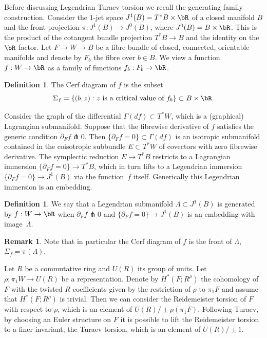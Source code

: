 \documentclass[JEP,XML,SOM,Unicode,NoFloatCountersInSection]{cedram}
\theoremstyle{plain}
\theoremstyle{definition}
\newtheorem{definition}[theorem]{Definition}
\newtheorem{remark}[theorem]{Remark}
\begin{document}
Before discussing Legendrian Turaev torsion we recall the generating family construction. Consider the $1$-jet space $J^1(B)=T^*B \times \bR$ of a closed manifold $B$ and the front projection $\pi: J^1(B) \to J^0(B)$, where $J^0(B)=B \times \bR$. This is the product of the cotangent bundle projection $T^*B \to B$ and the identity on the $\bR$ factor. Let $F \to W \to B$ be a fibre bundle of closed, connected, orientable manifolds and denote by $F_b$ the fibre over $b \in B$. We view a function $f:W \to \bR$ as a family of functions $f_b:F_b \to \bR$.

\begin{definition} The Cerf diagram of $f$ is the subset
\[
\Sigma_f=\{ (b,z) : \text{$z$ is a critical value of $f_b$} \} \subset B \times \bR.
\]
\end{definition}

Consider the graph of the differential $\Gamma(df) \subset T^*W$, which is a (graphical) Lagran\-gian submanifold. Suppose that the fibrewise derivative of $f$ satisfies the generic condition $\partial_F f \pitchfork 0 $. Then $ \{ \partial_F f = 0 \} \subset \Gamma(df)$ is an isotropic submanifold contained in the coisotropic subbundle $E \subset T^*W$ of covectors with zero fibrewise derivative. The symplectic reduction $E \to T^*B$ restricts to a Lagrangian immersion $\{ \partial_F f= 0 \} \to T^*B$, which in turn lifts to a Legendrian immersion $\{ \partial_Ff = 0 \} \to J^1(B)$ via the function~$f$ itself. Generically this Legendrian immersion is an embedding.

\begin{definition} We say that a Legendrian submanifold $\Lambda \subset J^1(B)$ is generated by $f:W \to \bR$ when $\partial_F f \pitchfork 0 $ and $\{ \partial_F f = 0 \} \to J^1 (B)$ is an embedding with image~$\Lambda$.
\end{definition}

\begin{remark}
Note that in particular the Cerf diagram of $f$ is the front of $\Lambda$, \ie $\Sigma_f=\pi(\Lambda)$.
\end{remark}

Let $R$ be a commutative ring and $U(R)$ its group of units. Let $\rho: \pi_1W \to U(R)$ be a representation. Denote by $H^*(F;R^\rho)$ the cohomology of $F$ with the twisted $R$ coefficients given by the restriction of $\rho$ to $\pi_1F$ and assume that $H^*(F;R^\rho)$ is trivial. Then we can consider the Reidemeister torsion of $F$ with respect to $\rho$, which is an element of $U(R) / \pm \rho(\pi_1F)$. Following Turaev, by choosing an Euler structure on $F$ it is possible to lift the Reidemeister torsion to a finer invariant, the Turaev torsion, which is an element of $U(R) / \pm 1$.
\end{document}
